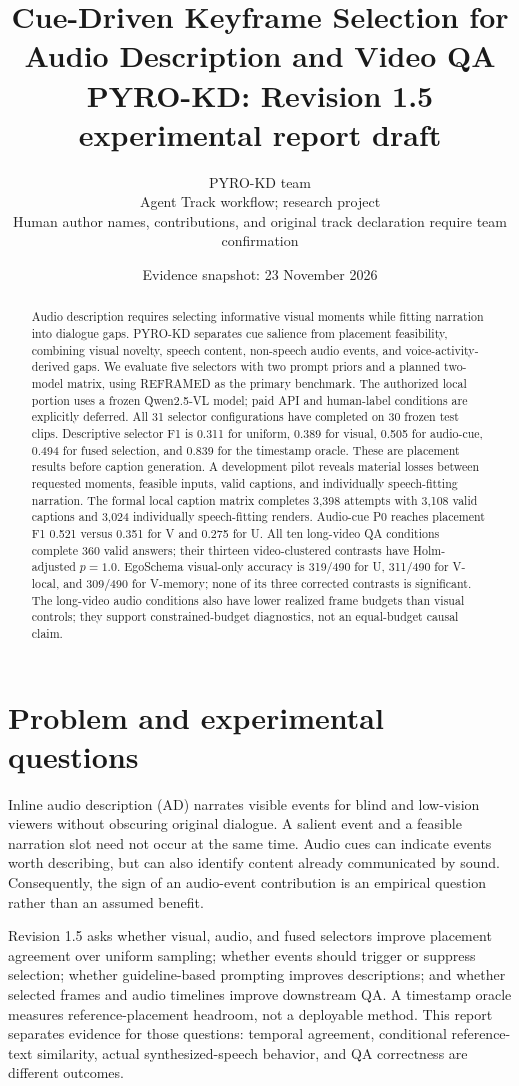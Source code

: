 \documentclass[10pt,twocolumn]{article}
\title{Cue-Driven Keyframe Selection for Audio Description and Video QA\\\large PYRO-KD: Revision 1.5 experimental report draft}
\author{PYRO-KD team\\\small Agent Track workflow; research project\\\small Human author names, contributions, and original track declaration require team confirmation}
\date{Evidence snapshot: 23 November 2026}
\begin{document}
\maketitle
\begin{abstract}
Audio description requires selecting informative visual moments while fitting narration into dialogue gaps. PYRO-KD separates cue salience from placement feasibility, combining visual novelty, speech content, non-speech audio events, and voice-activity-derived gaps. We evaluate five selectors with two prompt priors and a planned two-model matrix, using REFRAMED as the primary benchmark. The authorized local portion uses a frozen Qwen2.5-VL model; paid API and human-label conditions are explicitly deferred. All 31 selector configurations have completed on 30 frozen test clips. Descriptive selector F1 is 0.311 for uniform, 0.389 for visual, 0.505 for audio-cue, 0.494 for fused selection, and 0.839 for the timestamp oracle. These are placement results before caption generation. A development pilot reveals material losses between requested moments, feasible inputs, valid captions, and individually speech-fitting narration. The formal local caption matrix completes 3,398 attempts with 3,108 valid captions and 3,024 individually speech-fitting renders. Audio-cue P0 reaches placement F1 0.521 versus 0.351 for V and 0.275 for U. All ten long-video QA conditions complete 360 valid answers; their thirteen video-clustered contrasts have Holm-adjusted $p=1.0$. EgoSchema visual-only accuracy is 319/490 for U, 311/490 for V-local, and 309/490 for V-memory; none of its three corrected contrasts is significant. The long-video audio conditions also have lower realized frame budgets than visual controls; they support constrained-budget diagnostics, not an equal-budget causal claim.
\end{abstract}

\section{Problem and experimental questions}
Inline audio description (AD) narrates visible events for blind and low-vision viewers without obscuring original dialogue. A salient event and a feasible narration slot need not occur at the same time. Audio cues can indicate events worth describing, but can also identify content already communicated by sound. Consequently, the sign of an audio-event contribution is an empirical question rather than an assumed benefit.

Revision 1.5 asks whether visual, audio, and fused selectors improve placement agreement over uniform sampling; whether events should trigger or suppress selection; whether guideline-based prompting improves descriptions; and whether selected frames and audio timelines improve downstream QA. A timestamp oracle measures reference-placement headroom, not a deployable method. This report separates evidence for those questions: temporal agreement, conditional reference-text similarity, actual synthesized-speech behavior, and QA correctness are different outcomes.
\end{document}
